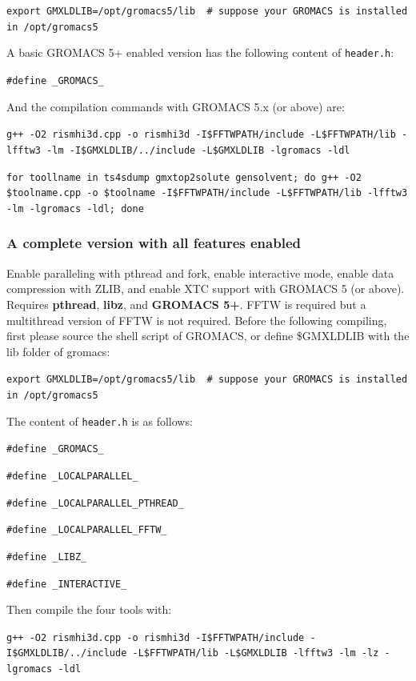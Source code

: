 \documentclass[aip,amsmath,amssymb,reprint,onecolumn]{revtex4-1}
\begin{document}
\texttt{\small\color{blue}export GMXLDLIB=/opt/gromacs5/lib {\color{lightgray} \# suppose your GROMACS is installed in /opt/gromacs5}}

A basic GROMACS 5+ enabled version has the following content of \texttt{header.h}:

\texttt{\small\color{navyblue}\#define \_GROMACS\_}

And the compilation commands with GROMACS 5.x (or above) are:

\texttt{\small\color{blue}g++ -O2 rismhi3d.cpp -o rismhi3d -I\$FFTWPATH/include -L\$FFTWPATH/lib -lfftw3 -lm -I\$GMXLDLIB/../include -L\$GMXLDLIB -lgromacs -ldl}

\texttt{\small\color{blue}for toollname in ts4sdump gmxtop2solute gensolvent; do g++ -O2 \$toolname.cpp -o \$toolname -I\$FFTWPATH/include -L\$FFTWPATH/lib -lfftw3 -lm -lgromacs -ldl; done}

\subsubsection{A complete version with all features enabled}

Enable paralleling with pthread and fork, enable interactive mode, enable data compression with ZLIB, and enable XTC support with GROMACS 5 (or above). Requires {\bf pthread}, {\bf libz}, and {\bf GROMACS 5+}. FFTW is required but a multithread version of FFTW is not required. Before the following compiling, first please source the shell script of GROMACS, or define \$GMXLDLIB with the lib folder of gromacs:

\texttt{\small\color{blue}export GMXLDLIB=/opt/gromacs5/lib {\color{lightgray} \# suppose your GROMACS is installed in /opt/gromacs5}}

The content of \texttt{header.h} is as follows:

\texttt{\small\color{blue}\#define \_GROMACS\_}

\texttt{\small\color{blue}\#define \_LOCALPARALLEL\_}

\texttt{\small\color{blue}\#define \_LOCALPARALLEL\_PTHREAD\_}

\texttt{\small\color{blue}\#define \_LOCALPARALLEL\_FFTW\_}

\texttt{\small\color{blue}\#define \_LIBZ\_}

\texttt{\small\color{blue}\#define \_INTERACTIVE\_}

Then compile the four tools with:

\texttt{\small\color{blue}g++ -O2 rismhi3d.cpp -o rismhi3d -I\$FFTWPATH/include -I\$GMXLDLIB/../include -L\$FFTWPATH/lib -L\$GMXLDLIB -lfftw3 -lm -lz -lgromacs -ldl}
\end{document}
